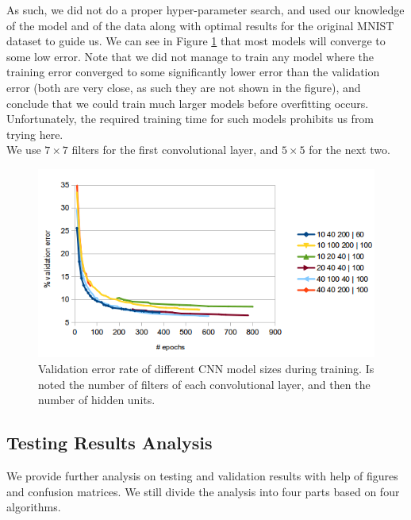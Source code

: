\documentclass{acm_proc_article-sp}
\begin{document}
As such, we did not do a proper hyper-parameter search, and used our knowledge of the model and of the data along with optimal results for the original MNIST dataset to guide us. We can see in Figure \ref{fig:conv_train} that most models will converge to some low error. Note that we did not manage to train any model where the training error converged to some significantly lower error than the validation error (both are very close, as such they are not shown in the figure), and conclude that we could train much larger models before overfitting occurs. Unfortunately, the required training time for such models prohibits us from trying here.\\
We use $7 \times 7$ filters for the first convolutional layer, and $5\times 5$ for the next two.
\begin{figure} 
\centering
\includegraphics[width=1\columnwidth]{graphs/conv_train.png}  
\caption{Validation error rate of different CNN model sizes during training. Is noted the number of filters of each convolutional layer, and then the number of hidden units.}
\label{fig:conv_train}
\end{figure}

\subsection{Testing Results Analysis}
We provide further analysis on testing and validation results with help of figures and confusion matrices. We still divide the analysis into four parts based on four algorithms.
\end{document}
